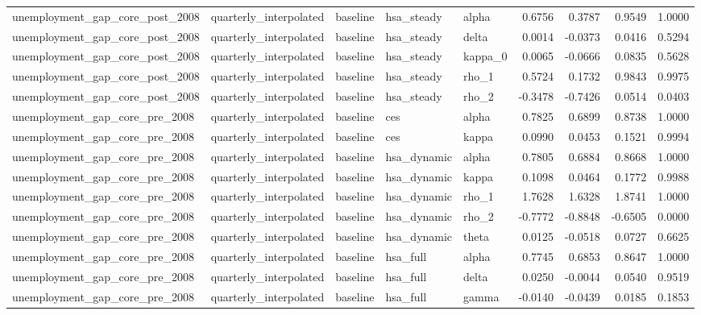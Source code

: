 \begin{tabular}{lllllrrrr}
unemployment\_gap\_core\_post\_2008 & quarterly\_interpolated & baseline & hsa\_steady & alpha & 0.6756 & 0.3787 & 0.9549 & 1.0000 \\
unemployment\_gap\_core\_post\_2008 & quarterly\_interpolated & baseline & hsa\_steady & delta & 0.0014 & -0.0373 & 0.0416 & 0.5294 \\
unemployment\_gap\_core\_post\_2008 & quarterly\_interpolated & baseline & hsa\_steady & kappa\_0 & 0.0065 & -0.0666 & 0.0835 & 0.5628 \\
unemployment\_gap\_core\_post\_2008 & quarterly\_interpolated & baseline & hsa\_steady & rho\_1 & 0.5724 & 0.1732 & 0.9843 & 0.9975 \\
unemployment\_gap\_core\_post\_2008 & quarterly\_interpolated & baseline & hsa\_steady & rho\_2 & -0.3478 & -0.7426 & 0.0514 & 0.0403 \\
unemployment\_gap\_core\_pre\_2008 & quarterly\_interpolated & baseline & ces & alpha & 0.7825 & 0.6899 & 0.8738 & 1.0000 \\
unemployment\_gap\_core\_pre\_2008 & quarterly\_interpolated & baseline & ces & kappa & 0.0990 & 0.0453 & 0.1521 & 0.9994 \\
unemployment\_gap\_core\_pre\_2008 & quarterly\_interpolated & baseline & hsa\_dynamic & alpha & 0.7805 & 0.6884 & 0.8668 & 1.0000 \\
unemployment\_gap\_core\_pre\_2008 & quarterly\_interpolated & baseline & hsa\_dynamic & kappa & 0.1098 & 0.0464 & 0.1772 & 0.9988 \\
unemployment\_gap\_core\_pre\_2008 & quarterly\_interpolated & baseline & hsa\_dynamic & rho\_1 & 1.7628 & 1.6328 & 1.8741 & 1.0000 \\
unemployment\_gap\_core\_pre\_2008 & quarterly\_interpolated & baseline & hsa\_dynamic & rho\_2 & -0.7772 & -0.8848 & -0.6505 & 0.0000 \\
unemployment\_gap\_core\_pre\_2008 & quarterly\_interpolated & baseline & hsa\_dynamic & theta & 0.0125 & -0.0518 & 0.0727 & 0.6625 \\
unemployment\_gap\_core\_pre\_2008 & quarterly\_interpolated & baseline & hsa\_full & alpha & 0.7745 & 0.6853 & 0.8647 & 1.0000 \\
unemployment\_gap\_core\_pre\_2008 & quarterly\_interpolated & baseline & hsa\_full & delta & 0.0250 & -0.0044 & 0.0540 & 0.9519 \\
unemployment\_gap\_core\_pre\_2008 & quarterly\_interpolated & baseline & hsa\_full & gamma & -0.0140 & -0.0439 & 0.0185 & 0.1853 \\

\end{tabular}

